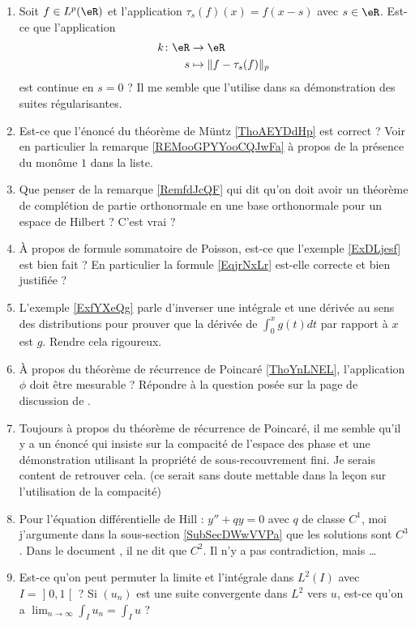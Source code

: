 \begin{enumerate}
    \item
        Soit \( f\in L^p(\eR)\) et l'application \( \tau_s(f)(x)=f(x-s)\) avec \( s\in \eR\). Est-ce que l'application
        \begin{equation}
            \begin{aligned}
                k\colon \eR&\to \eR \\
                s&\mapsto \| f-\tau_s(f) \|_p 
            \end{aligned}
        \end{equation}
        est continue en \( s=0\) ? Il me semble que \cite{ooYTNMooJsvznx} l'utilise dans sa démonstration des suites régularisantes.
    \item
        Est-ce que l'énoncé du théorème de Müntz \ref{ThoAEYDdHp} est correct ? Voir en particulier la remarque \ref{REMooGPYYooCQJwFa} à propos de la présence du monôme  \( 1\) dans la liste.
    \item
        Que penser de la remarque \ref{RemfdJcQF} qui dit qu'on doit avoir un théorème de complétion de partie orthonormale en une base orthonormale pour un espace de Hilbert ? C'est vrai ?
    \item
        À propos de formule sommatoire de Poisson, est-ce que l'exemple \ref{ExDLjesf} est bien fait ? En particulier la formule \eqref{EqjrNxLr} est-elle correcte et bien justifiée ?
    \item 
        L'exemple \ref{ExfYXeQg} parle d'inverser une intégrale et une dérivée au sens des distributions pour prouver que la dérivée de \( \int_0^xg(t)dt\) par rapport à \( x\) est \( g\). Rendre cela rigoureux.
    \item
        À propos du théorème de récurrence de Poincaré \ref{ThoYnLNEL}, l'application \( \phi\) doit être mesurable ? Répondre à la question posée sur la page de discussion de .
    \item
        Toujours à propos du théorème de récurrence de Poincaré, il me semble qu'il y a un énoncé qui insiste sur la compacité de l'espace des phase et une démonstration utilisant la propriété de sous-recouvrement fini. Je serais content de retrouver cela. (ce serait sans doute mettable dans la leçon sur l'utilisation de la compacité)
    \item
        Pour l'équation différentielle de Hill : \( y''+qy=0\) avec \( q\) de classe \( C^1\), moi j'argumente dans la sous-section \ref{SubSecDWwVVPa} que les solutions sont \( C^3\). Dans le document \cite{KXjFWKA}, il ne dit que \( C^2\). Il n'y a pas contradiction, mais \ldots
    \item 
        Est-ce qu'on peut permuter la limite et l'intégrale dans \( L^2(I)\) avec \( I=\mathopen] 0 , 1 \mathclose[\) ? Si \( (u_n)\) est une suite convergente dans \( L^2\) vers \( u\), est-ce qu'on a \( \lim_{n\to \infty} \int_Iu_n=\int_Iu\) ?


\end{enumerate}
